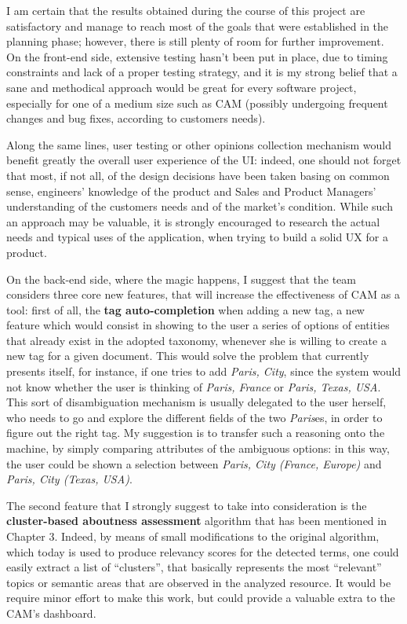 \documentclass[12pt,svgnames]{memoir}
\begin{document}
I am certain that the results obtained during the course of this project
are satisfactory and manage to reach most of the goals that were
established in the planning phase; however, there is still plenty of
room for further improvement. On the front-end side, extensive testing
hasn't been put in place, due to timing constraints and lack of a proper
testing strategy, and it is my strong belief that a sane and methodical
approach would be great for every software project, especially for one
of a medium size such as CAM (possibly undergoing frequent changes and
bug fixes, according to customers needs).

Along the same lines, user testing or other opinions collection
mechanism would benefit greatly the overall user experience of the UI:
indeed, one should not forget that most, if not all, of the design
decisions have been taken basing on common sense, engineers' knowledge
of the product and Sales and Product Managers' understanding of the
customers needs and of the market's condition. While such an approach
may be valuable, it is strongly encouraged to research the actual needs
and typical uses of the application, when trying to build a solid UX for
a product.

On the back-end side, where the magic happens, I suggest that the team
considers three core new features, that will increase the effectiveness
of CAM as a tool: first of all, the \textbf{tag auto-completion} when
adding a new tag, a new feature which would consist in showing to the
user a series of options of entities that already exist in the adopted
taxonomy, whenever she is willing to create a new tag for a given
document. This would solve the problem that currently presents itself,
for instance, if one tries to add \emph{Paris, City}, since the system
would not know whether the user is thinking of \emph{Paris, France} or
\emph{Paris, Texas, USA}. This sort of disambiguation mechanism is
usually delegated to the user herself, who needs to go and explore the
different fields of the two \emph{Paris}es, in order to figure out the
right tag. My suggestion is to transfer such a reasoning onto the
machine, by simply comparing attributes of the ambiguous options: in
this way, the user could be shown a selection between \emph{Paris, City
(France, Europe)} and \emph{Paris, City (Texas, USA)}.

The second feature that I strongly suggest to take into consideration is
the \textbf{cluster-based aboutness assessment} algorithm that has been
mentioned in Chapter 3. Indeed, by means of small modifications to the
original algorithm, which today is used to produce relevancy scores for
the detected terms, one could easily extract a list of ``clusters'',
that basically represents the most ``relevant'' topics or semantic areas
that are observed in the analyzed resource. It would be require minor
effort to make this work, but could provide a valuable extra to the
CAM's dashboard.
\end{document}
